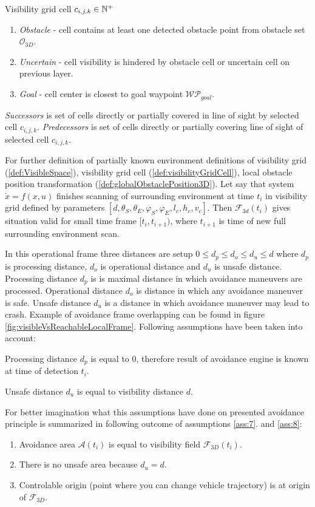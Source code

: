 \begin{definition}{Visibility grid cell $c_{i,j,k}\in\mathbb{N}^+$}
\begin{enumerate}
        \item \textit{Obstacle} - cell contains at least one detected obstacle point from obstacle set $\mathscr{O}_{3D}$.
        \item \textit{Uncertain} - cell visibility is hindered by obstacle cell or uncertain cell on previous layer.
        \item \textit{Goal} - cell center is closest to goal waypoint $\mathscr{WP}_{goal}$.
    \end{enumerate}
    \textit{Successors} is set of cells directly or partially covered in line of sight by selected cell $c_{i,j,k}$. \textit{Predecessors} is set of cells directly or partially covering line of sight of selected cell $c_{i,j,k}$.
\end{definition}
\noindent For  further definition of partially known environment definitions of  visibility grid (\ref{def:VisibleSpace}), visibility grid cell (\ref{def:visibilityGridCell}), local obstacle position transformation (\ref{def:globalObstaclePosition3D}). Let say that system $\dot{x} = f(x,u)$ finishes scanning of surrounding environment at time $t_i$ in visibility grid defined by  parameters $[d,\theta_S,\theta_E,\varphi_S,\varphi_E,l_c,h_c,v_c]$. Then $\mathscr{F}_{3d}(t_i)$ gives situation valid for small time frame $[t_i,t_{i+1})$, where $t_{i+1}$ is time of new full surrounding environment scan. 

In this operational frame three distances are setup $0 \le d_p \le d_o \le  d_u \le d$ where $d_p$ is processing distance, $d_o$ is operational distance and $d_u$ is unsafe distance. Processing distance $d_p$ is is maximal distance in which avoidance maneuvers are processed. Operational distance $d_o$ is distance in which  any avoidance maneuver is safe. Unsafe distance $d_u$ is a distance in which avoidance maneuver may lead to crash. Example of avoidance frame overlapping can be found in figure \ref{fig:visibleVsReachableLocalFrame}. Following assumptions have been taken into account:

\begin{assumption}{Processing distance $d_p$ is equal to 0, therefore result of avoidance engine is known at time of detection $t_i$.}\label{ass:7}\end{assumption}
\begin{assumption}{Unsafe distance $d_u$ is equal to visibility distance $d$.}\label{ass:8}\end{assumption}
\noindent For better imagination what this assumptions have done on presented avoidance principle is summarized in following outcome of assumptions \ref{ass:7}. and \ref{ass:8}:
\begin{enumerate}
    \item Avoidance area $\mathscr{A}(t_i)$ is equal to visibility field $\mathscr{F}_{3D}(t_i)$.
    \item There is no unsafe area because $d_u=d$.
    \item Controlable origin (point where you can change vehicle trajectory) is at origin of $\mathscr{F}_{3D}$.
\end{enumerate}

